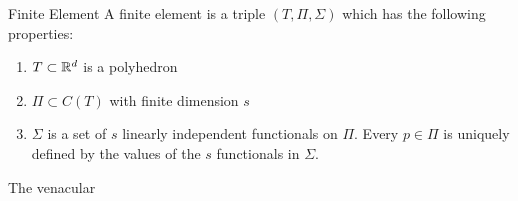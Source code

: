 \begin{defn}{Finite Element}
    A finite element is a triple $(T, \Pi,\Sigma)$ which has the following properties:
    \label{def:finite_element}
    \begin{enumerate}
        \item $T\subset \mathbb{R}^d$ is a polyhedron
        \item $\Pi \subset C(T)$ with finite dimension $s$
        \item $\Sigma$ is a set of $s$ linearly independent functionals on $\Pi$. 
        Every $p\in \Pi$ is uniquely defined by the values of the $s$ functionals in $\Sigma$.
    \end{enumerate}
\end{defn}
The venacular 